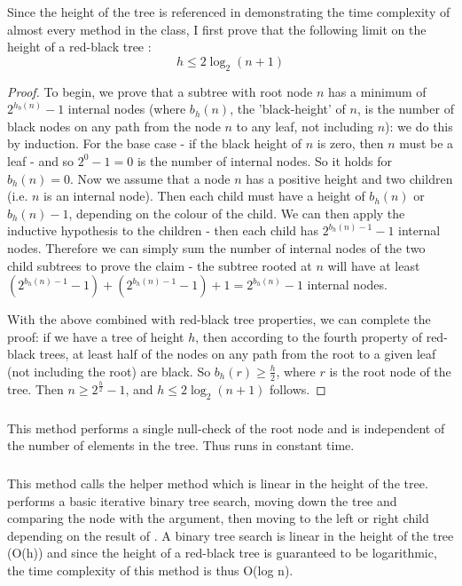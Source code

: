 Since the height of the tree is referenced in demonstrating the time complexity of almost every method in the class, I first prove that the following limit on the height of a red-black tree \parencite{clrs}:
\begin{equation*}
h \leq 2\log_2(n+1)
\end{equation*}
\begin{proof}
To begin, we prove that a subtree with root node $n$ has a minimum of $2^{h_b(n)} - 1$ internal nodes (where $b_h(n)$, the 'black-height' of $n$, is the number of black nodes on any path from the node $n$ to any leaf, not including $n$): we do this by induction. For the base case - if the black height of $n$ is zero, then $n$ must be a leaf - and so $2^0 - 1 = 0$ is the number of internal nodes. So it holds for $b_h(n) = 0$. Now we assume that a node $n$ has a positive height and two children (i.e. $n$ is an internal node). Then each child must have a height of $b_h(n)$ or $b_h(n) - 1$, depending on the colour of the child. We can then apply the inductive hypothesis to the children - then each child has $2^{b_h(n) - 1} - 1$ internal nodes. Therefore we can simply sum the number of internal nodes of the two child subtrees to prove the claim - the subtree rooted at $n$ will have at least $(2^{b_h(n) - 1} - 1) + (2^{b_h(n) - 1} - 1) + 1 = 2^{b_h(n)} - 1$ internal nodes.

With the above combined with red-black tree properties, we can complete the proof: if we have a tree of height $h$, then according to the fourth property of red-black trees, at least half of the nodes on any path from the root to a given leaf (not including the root) are black. So $b_h(r) \geq \frac{h}{2}$, where $r$ is the root node of the tree. Then $n \geq 2^{\frac h 2} - 1$, and $h \leq 2\log_2(n + 1)$ follows.
\end{proof}

\subsubsection{}
This method performs a single null-check of the root node and is independent of the number of elements in the tree. Thus  runs in constant time.

\subsubsection{}
This method calls the helper method  which is linear in the height of the tree.  performs a basic iterative binary tree search, moving down the tree and comparing the node with the argument, then moving to the left or right child depending on the result of . A binary tree search is linear in the height of the tree (O(h)) and since the height of a red-black tree is guaranteed to be logarithmic, the time complexity of this method is thus O(log n).


